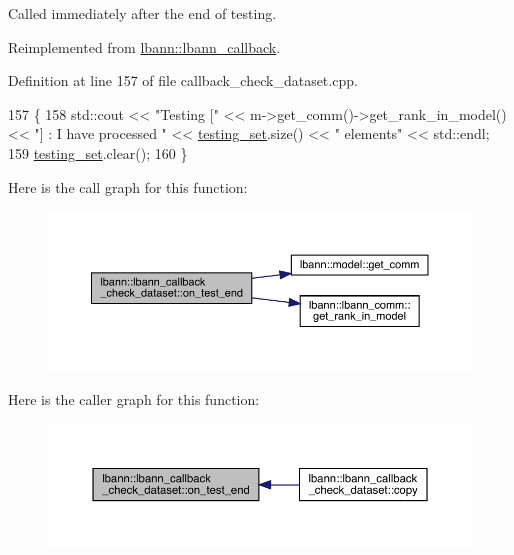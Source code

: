 Called immediately after the end of testing. 

Reimplemented from \hyperlink{classlbann_1_1lbann__callback_accbad4dd004c1ced33642db6398b2efe}{lbann\+::lbann\+\_\+callback}.



Definition at line 157 of file callback\+\_\+check\+\_\+dataset.\+cpp.


\begin{DoxyCode}
157                                                        \{
158   std::cout << \textcolor{stringliteral}{"Testing ["} << m->get\_comm()->get\_rank\_in\_model() << \textcolor{stringliteral}{"] : I have processed "} << 
      \hyperlink{classlbann_1_1lbann__callback__check__dataset_a15445849bae3621a3a4364b3ebbbc7f3}{testing\_set}.size() << \textcolor{stringliteral}{" elements"} << std::endl;
159   \hyperlink{classlbann_1_1lbann__callback__check__dataset_a15445849bae3621a3a4364b3ebbbc7f3}{testing\_set}.clear();
160 \}
\end{DoxyCode}
Here is the call graph for this function\+:\nopagebreak
\begin{figure}[H]
\begin{center}
\leavevmode
\includegraphics[width=350pt]{classlbann_1_1lbann__callback__check__dataset_afe1fda5a6bfe632dc680230cc56dff3e_cgraph}
\end{center}
\end{figure}
Here is the caller graph for this function\+:\nopagebreak
\begin{figure}[H]
\begin{center}
\leavevmode
\includegraphics[width=350pt]{classlbann_1_1lbann__callback__check__dataset_afe1fda5a6bfe632dc680230cc56dff3e_icgraph}
\end{center}
\end{figure}
\mbox{\label{classlbann_1_1lbann__callback__check__dataset_a9bcb1368152c621c4484136ec8eecff8}} 
